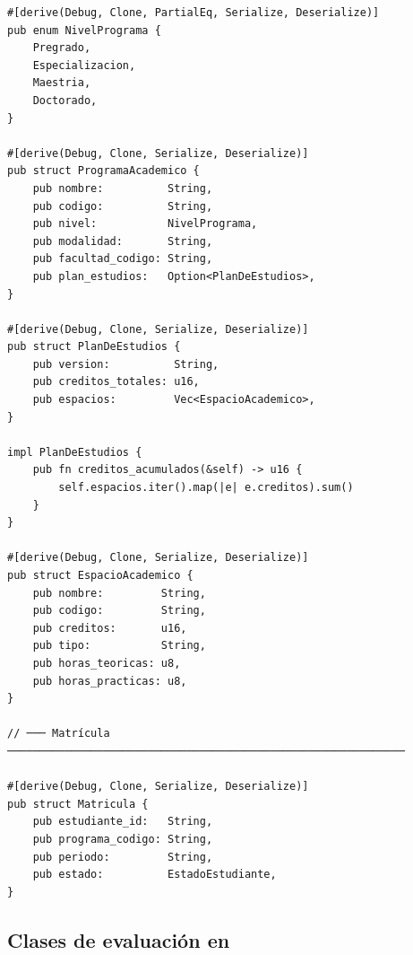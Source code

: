 \begin{lstlisting}[style=rustStyle, caption={Actores del dominio en \rust}, label={lst:rust-actores}]
#[derive(Debug, Clone, PartialEq, Serialize, Deserialize)]
pub enum NivelPrograma {
    Pregrado,
    Especializacion,
    Maestria,
    Doctorado,
}

#[derive(Debug, Clone, Serialize, Deserialize)]
pub struct ProgramaAcademico {
    pub nombre:          String,
    pub codigo:          String,
    pub nivel:           NivelPrograma,
    pub modalidad:       String,
    pub facultad_codigo: String,
    pub plan_estudios:   Option<PlanDeEstudios>,
}

#[derive(Debug, Clone, Serialize, Deserialize)]
pub struct PlanDeEstudios {
    pub version:          String,
    pub creditos_totales: u16,
    pub espacios:         Vec<EspacioAcademico>,
}

impl PlanDeEstudios {
    pub fn creditos_acumulados(&self) -> u16 {
        self.espacios.iter().map(|e| e.creditos).sum()
    }
}

#[derive(Debug, Clone, Serialize, Deserialize)]
pub struct EspacioAcademico {
    pub nombre:         String,
    pub codigo:         String,
    pub creditos:       u16,
    pub tipo:           String,
    pub horas_teoricas: u8,
    pub horas_practicas: u8,
}

// ─── Matrícula ──────────────────────────────────────────────────────────────

#[derive(Debug, Clone, Serialize, Deserialize)]
pub struct Matricula {
    pub estudiante_id:   String,
    pub programa_codigo: String,
    pub periodo:         String,
    pub estado:          EstadoEstudiante,
}
\end{lstlisting}

\subsection{Clases de evaluación en \rust}
\label{subsec:rust-evaluacion}

